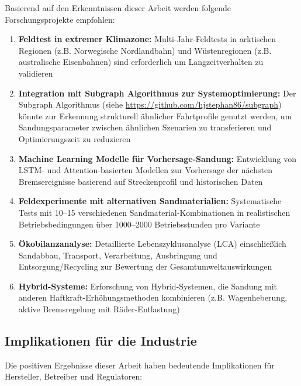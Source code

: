 \documentclass[a4paper,12pt]{article}
\theoremstyle{definition}
\begin{document}
Basierend auf den Erkenntnissen dieser Arbeit werden folgende Forschungsprojekte empfohlen:

\begin{enumerate}
	\item \textbf{Feldtest in extremer Klimazone:} Multi-Jahr-Feldtests in arktischen Regionen (z.B. Norwegische Nordlandbahn) und Wüstenregionen (z.B. australische Eisenbahnen) sind erforderlich um Langzeitverhalten zu validieren
	
	\item \textbf{Integration mit Subgraph Algorithmus zur Systemoptimierung:} Der Subgraph Algorithmus (siehe \url{https://github.com/hjstephan86/subgraph}) könnte zur Erkennung strukturell ähnlicher Fahrtprofile genutzt werden, um Sandungsparameter zwischen ähnlichen Szenarien zu transferieren und Optimierungszeit zu reduzieren
	
	\item \textbf{Machine Learning Modelle für Vorhersage-Sandung:} Entwicklung von LSTM- und Attention-basierten Modellen zur Vorhersage der nächsten Bremsereignisse basierend auf Streckenprofil und historischen Daten
	
	\item \textbf{Feldexperimente mit alternativen Sandmaterialien:} Systematische Tests mit 10--15 verschiedenen Sandmaterial-Kombinationen in realistischen Betriebsbedingungen über 1000--2000 Betriebsstunden pro Variante
	
	\item \textbf{Ökobilanzanalyse:} Detaillierte Lebenszyklusanalyse (LCA) einschließlich Sandabbau, Transport, Verarbeitung, Ausbringung und Entsorgung/Recycling zur Bewertung der Gesamtumweltauswirkungen
	
	\item \textbf{Hybrid-Systeme:} Erforschung von Hybrid-Systemen, die Sandung mit anderen Haftkraft-Erhöhungsmethoden kombinieren (z.B. Wagenheberung, aktive Bremsregelung mit Räder-Entlastung)
\end{enumerate}

\subsection{Implikationen für die Industrie}

Die positiven Ergebnisse dieser Arbeit haben bedeutende Implikationen für Hersteller, Betreiber und Regulatoren:
\end{document}

